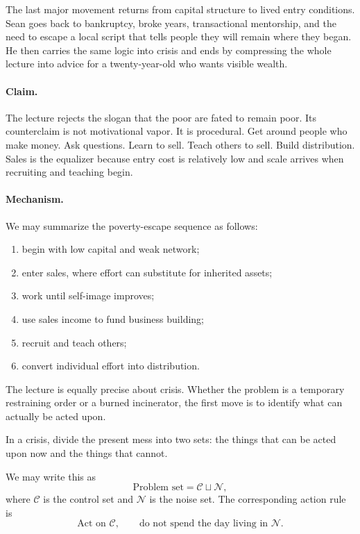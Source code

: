 The last major movement returns from capital structure to lived entry conditions. Sean goes back to bankruptcy, broke years, transactional mentorship, and the need to escape a local script that tells people they will remain where they began. He then carries the same logic into crisis and ends by compressing the whole lecture into advice for a twenty-year-old who wants visible wealth.

\paragraph{Claim.}
The lecture rejects the slogan that the poor are fated to remain poor. Its counterclaim is not motivational vapor. It is procedural. Get around people who make money. Ask questions. Learn to sell. Teach others to sell. Build distribution. Sales is the equalizer because entry cost is relatively low and scale arrives when recruiting and teaching begin.

\paragraph{Mechanism.}
We may summarize the poverty-escape sequence as follows:
\begin{enumerate}
\item begin with low capital and weak network;
\item enter sales, where effort can substitute for inherited assets;
\item work until self-image improves;
\item use sales income to fund business building;
\item recruit and teach others;
\item convert individual effort into distribution.
\end{enumerate}

The lecture is equally precise about crisis. Whether the problem is a temporary restraining order or a burned incinerator, the first move is to identify what can actually be acted upon.

\begin{definition}
In a crisis, divide the present mess into two sets: the things that can be acted upon now and the things that cannot.
\end{definition}

We may write this as
\begin{equation}
\text{Problem set} = \mathcal{C} \sqcup \mathcal{N},
\end{equation}
where \(\mathcal{C}\) is the control set and \(\mathcal{N}\) is the noise set. The corresponding action rule is
\begin{equation}
\text{Act on } \mathcal{C}, \qquad \text{do not spend the day living in } \mathcal{N}.
\end{equation}

